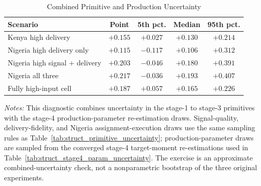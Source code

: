 \begin{table}[H]
\centering
\caption{Combined Primitive and Production Uncertainty}
\label{tab:struct_combined_uncertainty}
\begin{threeparttable}
\begin{tabular}[t]{lcccc}
\toprule
Scenario & Point & 5th pct. & Median & 95th pct. \\
\midrule
Kenya high delivery & $+0.155$ & $+0.027$ & $+0.130$ & $+0.214$ \\
Nigeria high delivery only & $+0.115$ & $-0.117$ & $+0.106$ & $+0.312$ \\
Nigeria high signal + delivery & $+0.203$ & $-0.046$ & $+0.180$ & $+0.391$ \\
Nigeria all three & $+0.217$ & $-0.036$ & $+0.193$ & $+0.407$ \\
Fully high-input cell & $+0.187$ & $+0.057$ & $+0.165$ & $+0.226$ \\
\bottomrule
\end{tabular}
\begin{tablenotes}
\footnotesize
\item \textit{Notes:} This diagnostic combines uncertainty in the stage-1 to stage-3 primitives with the stage-4 production-parameter re-estimation draws. Signal-quality, delivery-fidelity, and Nigeria assignment-execution draws use the same sampling rules as Table~\ref{tab:struct_primitive_uncertainty}; production-parameter draws are sampled from the converged stage-4 target-moment re-estimations used in Table~\ref{tab:struct_stage4_param_uncertainty}. The exercise is an approximate combined-uncertainty check, not a nonparametric bootstrap of the three original experiments.
\end{tablenotes}
\end{threeparttable}
\end{table}
